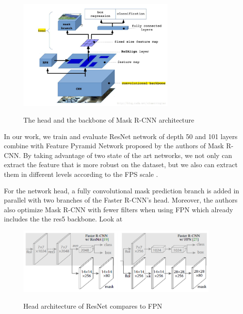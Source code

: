 	\begin{figure}[H]
		\centering
		{\includegraphics[width=0.7\textwidth]{./hinhanh/chap5/architecture_mrcnn.png}}
		\caption{The head and the backbone of Mask R-CNN architecture}
		\label{fig:architecture_mrcnn}
	\end{figure}
	
	In our work, we train and evaluate ResNet network of depth 50 and 101 layers \cite{resnet} combine with Feature Pyramid Network proposed by the authors of Mask R-CNN. By taking advantage of two state of the art networks, we not only can extract the feature that is more robust on the dataset, but we also can extract them in different levels according to the FPS scale \cite{maskrcnn}.
	
	For the network head, a fully convolutional mask prediction branch is added in parallel with two branches of the Faster R-CNN's head. Moreover, the authors also optimize Mask R-CNN with fewer filters when using FPN which already includes the the res5 backbone. Look at 
	
	\begin{figure}[H]
		\centering
		{\includegraphics[width=0.9\textwidth]{./hinhanh/chap5/fpn_res5.png}}
		\caption{Head architecture of ResNet compares to FPN}
		\label{fig:fpn_res5}
	\end{figure}
	
	
	
	
	
	
	
